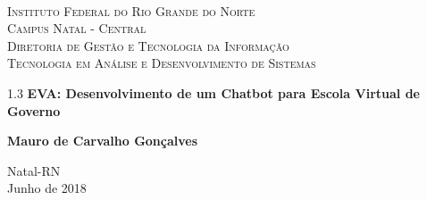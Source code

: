 \begin{titlepage}
	\begin{center}
		
		  
		\begin{minipage}{11.15cm}
			\begin{center}
				\begin{espacosimples}
					{\small \ \\
                       \textsc{Instituto Federal do Rio Grande do Norte}
                       \\
							  \textsc{Campus Natal - Central}					\\
							  \textsc{Diretoria de Gestão e Tecnologia da Informação}	   
							  \\
							  \textsc{Tecnologia em Análise e Desenvolvimento de Sistemas}}   	
                       \\
				\end{espacosimples}
			\end{center}
		\end{minipage}

			
		\vspace{6cm}
						
		{\setlength{\baselineskip}%
		{1.3\baselineskip}
		{\LARGE \textbf{EVA: Desenvolvimento de um Chatbot para Escola Virtual de Governo}}\par}
			
		\vspace{3cm}
			
		{\large \textbf{Mauro de Carvalho Gonçalves}}
						
		\vspace{6cm}
		
		Natal-RN\\Junho de 2018
	\end{center}
\end{titlepage}